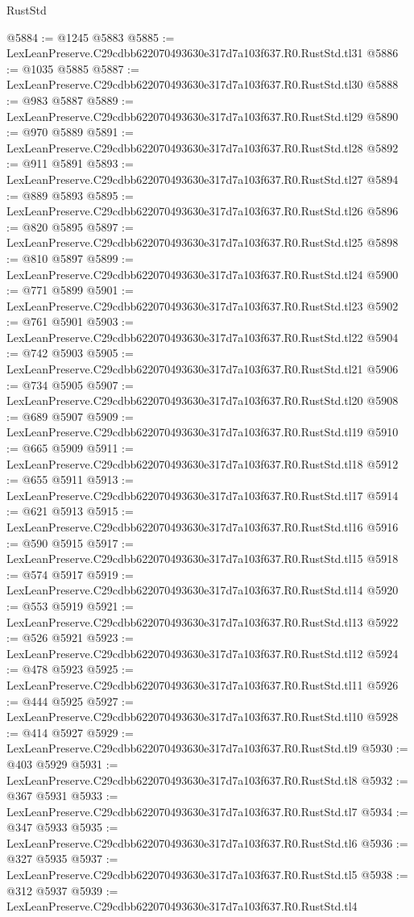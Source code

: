 \begin{lexlean}{RustStd}
\begin{coremodule}
@5884 := @1245 @5883
@5885 := LexLeanPreserve.C29cdbb622070493630e317d7a103f637.R0.RustStd.tl31
@5886 := @1035 @5885
@5887 := LexLeanPreserve.C29cdbb622070493630e317d7a103f637.R0.RustStd.tl30
@5888 := @983 @5887
@5889 := LexLeanPreserve.C29cdbb622070493630e317d7a103f637.R0.RustStd.tl29
@5890 := @970 @5889
@5891 := LexLeanPreserve.C29cdbb622070493630e317d7a103f637.R0.RustStd.tl28
@5892 := @911 @5891
@5893 := LexLeanPreserve.C29cdbb622070493630e317d7a103f637.R0.RustStd.tl27
@5894 := @889 @5893
@5895 := LexLeanPreserve.C29cdbb622070493630e317d7a103f637.R0.RustStd.tl26
@5896 := @820 @5895
@5897 := LexLeanPreserve.C29cdbb622070493630e317d7a103f637.R0.RustStd.tl25
@5898 := @810 @5897
@5899 := LexLeanPreserve.C29cdbb622070493630e317d7a103f637.R0.RustStd.tl24
@5900 := @771 @5899
@5901 := LexLeanPreserve.C29cdbb622070493630e317d7a103f637.R0.RustStd.tl23
@5902 := @761 @5901
@5903 := LexLeanPreserve.C29cdbb622070493630e317d7a103f637.R0.RustStd.tl22
@5904 := @742 @5903
@5905 := LexLeanPreserve.C29cdbb622070493630e317d7a103f637.R0.RustStd.tl21
@5906 := @734 @5905
@5907 := LexLeanPreserve.C29cdbb622070493630e317d7a103f637.R0.RustStd.tl20
@5908 := @689 @5907
@5909 := LexLeanPreserve.C29cdbb622070493630e317d7a103f637.R0.RustStd.tl19
@5910 := @665 @5909
@5911 := LexLeanPreserve.C29cdbb622070493630e317d7a103f637.R0.RustStd.tl18
@5912 := @655 @5911
@5913 := LexLeanPreserve.C29cdbb622070493630e317d7a103f637.R0.RustStd.tl17
@5914 := @621 @5913
@5915 := LexLeanPreserve.C29cdbb622070493630e317d7a103f637.R0.RustStd.tl16
@5916 := @590 @5915
@5917 := LexLeanPreserve.C29cdbb622070493630e317d7a103f637.R0.RustStd.tl15
@5918 := @574 @5917
@5919 := LexLeanPreserve.C29cdbb622070493630e317d7a103f637.R0.RustStd.tl14
@5920 := @553 @5919
@5921 := LexLeanPreserve.C29cdbb622070493630e317d7a103f637.R0.RustStd.tl13
@5922 := @526 @5921
@5923 := LexLeanPreserve.C29cdbb622070493630e317d7a103f637.R0.RustStd.tl12
@5924 := @478 @5923
@5925 := LexLeanPreserve.C29cdbb622070493630e317d7a103f637.R0.RustStd.tl11
@5926 := @444 @5925
@5927 := LexLeanPreserve.C29cdbb622070493630e317d7a103f637.R0.RustStd.tl10
@5928 := @414 @5927
@5929 := LexLeanPreserve.C29cdbb622070493630e317d7a103f637.R0.RustStd.tl9
@5930 := @403 @5929
@5931 := LexLeanPreserve.C29cdbb622070493630e317d7a103f637.R0.RustStd.tl8
@5932 := @367 @5931
@5933 := LexLeanPreserve.C29cdbb622070493630e317d7a103f637.R0.RustStd.tl7
@5934 := @347 @5933
@5935 := LexLeanPreserve.C29cdbb622070493630e317d7a103f637.R0.RustStd.tl6
@5936 := @327 @5935
@5937 := LexLeanPreserve.C29cdbb622070493630e317d7a103f637.R0.RustStd.tl5
@5938 := @312 @5937
@5939 := LexLeanPreserve.C29cdbb622070493630e317d7a103f637.R0.RustStd.tl4

\end{coremodule}
\end{lexlean}
